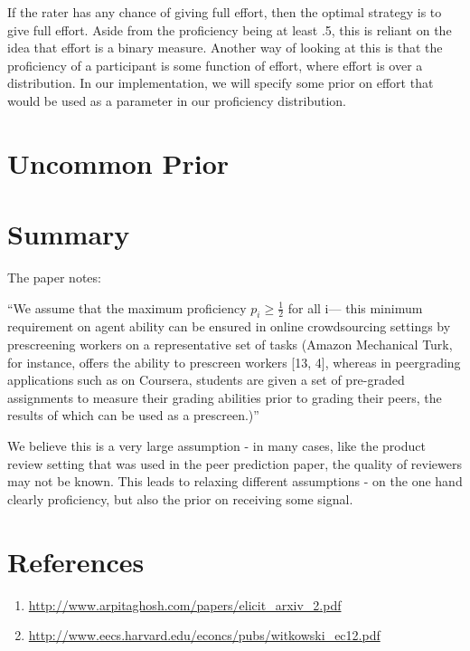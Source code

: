\documentclass{article}
\begin{document}
If the rater has any chance of giving full effort, then the optimal strategy is to give full effort. Aside from the proficiency being at least .5, this is reliant on the idea that effort is a binary measure. Another way of looking at this is that the proficiency of a participant is some function of effort, where effort is over a distribution. In our implementation, we will specify some prior on effort that would be used as a parameter in our proficiency distribution.


\section{Uncommon Prior}

\section{Summary}
The paper notes: 

\begin{displayquote}
``We assume that the maximum proficiency $p_i \geq \frac{1}{2}$ for all i— this minimum requirement on agent ability can be ensured in online crowdsourcing settings by prescreening workers on a representative set of tasks (Amazon Mechanical Turk, for instance, offers the ability to prescreen workers [13, 4], whereas in peergrading applications such as on Coursera, students are given a set of pre-graded assignments to measure their grading abilities prior to grading their peers, the results of which can be used as a prescreen.)''
\end{displayquote}

We believe this is a very large assumption - in many cases, like the product review setting that was used in the peer prediction paper, the quality of reviewers may not be known. This leads to relaxing different assumptions - on the one hand clearly proficiency, but also the prior on receiving some signal.

\section{References}
\begin{enumerate}
	\item \url{http://www.arpitaghosh.com/papers/elicit_arxiv_2.pdf} \label{itm:1}
	\item \url{http://www.eecs.harvard.edu/econcs/pubs/witkowski_ec12.pdf} \label{itm:2}
\end{enumerate}
\end{document}
